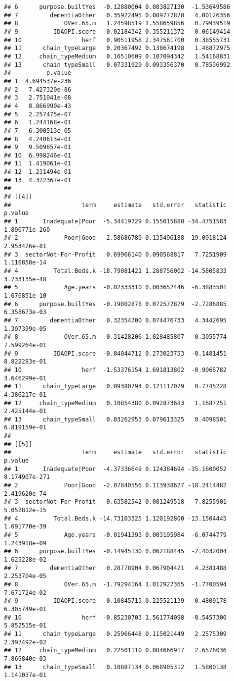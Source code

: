 \documentclass[]{article}
\begin{document}
\begin{verbatim}
## 6      purpose.builtYes  -0.12880004 0.083827130  -1.53649586
## 7         dementiaOther   0.35922495 0.089777878   4.00126356
## 8             OVer.65.m   1.24598519 1.558659856   0.79939519
## 9          IDAOPI.score  -0.02184342 0.355211372  -0.06149414
## 10                 herf   0.90511958 2.347561700   0.38555731
## 11      chain_typeLarge   0.20367492 0.138674198   1.46872975
## 12     chain_typeMedium   0.16510609 0.107094342   1.54168831
## 13      chain_typeSmall   0.07331929 0.093356370   0.78536992
##          p.value
## 1  4.694537e-236
## 2   7.427320e-86
## 3   2.751041e-08
## 4   8.866990e-43
## 5   2.257475e-07
## 6   1.244168e-01
## 7   6.300513e-05
## 8   4.240613e-01
## 9   9.509657e-01
## 10  6.998246e-01
## 11  1.419061e-01
## 12  1.231494e-01
## 13  4.322367e-01
## 
## [[4]]
##                    term     estimate   std.error   statistic       p.value
## 1       Inadequate|Poor  -5.34419729 0.155015888 -34.4751583 1.890771e-260
## 2             Poor|Good  -2.58686780 0.135496188 -19.0918124  2.953426e-81
## 3  sectorNot-For-Profit   0.69966140 0.090568817   7.7251909  1.116858e-14
## 4          Total.Beds.k -18.79081421 1.288756002 -14.5805833  3.733135e-48
## 5             Age.years  -0.02333310 0.003652446  -6.3883501  1.676851e-10
## 6      purpose.builtYes  -0.19802878 0.072572879  -2.7286885  6.358673e-03
## 7         dementiaOther   0.32354700 0.074476733   4.3442695  1.397399e-05
## 8             OVer.65.m  -0.31428206 1.028485807  -0.3055774  7.599264e-01
## 9          IDAOPI.score  -0.04044712 0.273023753  -0.1481451  8.822283e-01
## 10                 herf  -1.53376154 1.691813802  -0.9065782  3.646299e-01
## 11      chain_typeLarge   0.09380794 0.121117079   0.7745228  4.386217e-01
## 12     chain_typeMedium   0.10854380 0.092873683   1.1687251  2.425144e-01
## 13      chain_typeSmall   0.03262953 0.079613325   0.4098501  6.819159e-01
## 
## [[5]]
##                    term     estimate   std.error   statistic       p.value
## 1       Inadequate|Poor  -4.37336649 0.124384694 -35.1600052 8.174907e-271
## 2             Poor|Good  -2.07840556 0.113938627 -18.2414482  2.419620e-74
## 3  sectorNot-For-Profit   0.63582542 0.081249518   7.8255901  5.052812e-15
## 4          Total.Beds.k -14.73103325 1.120192800 -13.1504445  1.691770e-39
## 5             Age.years  -0.01941393 0.003195984  -6.0744779  1.243918e-09
## 6      purpose.builtYes  -0.14945130 0.062188445  -2.4032004  1.625228e-02
## 7         dementiaOther   0.28778904 0.067904421   4.2381488  2.253704e-05
## 8             OVer.65.m  -1.79294164 1.012927365  -1.7700594  7.671724e-02
## 9          IDAOPI.score  -0.10845713 0.225521139  -0.4809178  6.305749e-01
## 10                 herf  -0.85230703 1.561774098  -0.5457300  5.852515e-01
## 11      chain_typeLarge   0.25966448 0.115021449   2.2575309  2.397492e-02
## 12     chain_typeMedium   0.22501110 0.084666917   2.6576036  7.869840e-03
## 13      chain_typeSmall   0.10887134 0.068905312   1.5800138  1.141037e-01
\end{verbatim}
\end{document}
